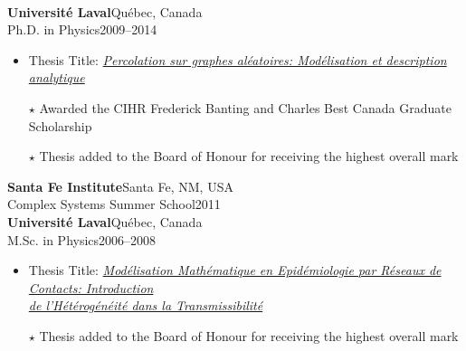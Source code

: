 \documentclass[11pt]{article}
\newlength{\BoxWidth}
\newcommand{\TitreA}[1]{\colorbox{background}{\makebox[\BoxWidth][c]{\Large\textrm{\textsc{#1}}}}\vspace{0.75\baselineskip}\\}
\begin{document}
%
%
%
%
%
\TitreA{Education}
%
\textbf{Universit\'e Laval}\hfill Qu\'ebec, Canada\\
Ph.D. in Physics\hfill 2009--2014
\begin{itemize}[noitemsep, leftmargin=1.5em, topsep=0pt, after=\vspace{0.75\baselineskip}]\small
  \item Thesis Title: \href{http://hdl.handle.net/20.500.11794/25058}{\textit{Percolation sur graphes al\'eatoires: Mod\'elisation et description analytique}}\footnotemark
  \item[$\star$] Awarded the CIHR Frederick Banting and Charles Best Canada Graduate Scholarship
  \item[$\star$] Thesis added to the Board of Honour for receiving the highest overall mark
\end{itemize}
%
\textbf{Santa Fe Institute}\hfill Santa Fe, NM, USA\\
Complex Systems Summer School\hfill 2011
\vspace{0.75\baselineskip}\\
%
\textbf{Universit\'e Laval}\hfill Qu\'ebec, Canada\\
M.Sc. in Physics\hfill 2006--2008
\begin{itemize}[noitemsep, leftmargin=1.5em, topsep=0pt, after=\vspace{0.75\baselineskip}]\small
  \item Thesis Title: \href{http://hdl.handle.net/20.500.11794/20317}{\textit{Mod\'elisation Math\'ematique en Epid\'emiologie par R\'eseaux de Contacts: Introduction\\de l'H\'et\'erog\'en\'eit\'e dans la Transmissibilit\'e}}\footnotemark
  \item[$\star$] Thesis added to the Board of Honour for receiving the highest overall mark
\end{itemize}
\end{document}
